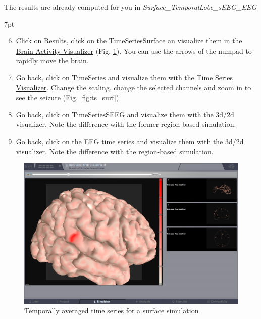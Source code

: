 \documentclass{tufte-handout}
\newenvironment{simulation}{%
  \def\FrameCommand{%
    \hspace{1pt}%
    {\color{ForestGreen}\vrule width 2pt}%
    {\color{simulationshade}\vrule width 4pt}%
    \colorbox{simulationshade}%
  }%
  \MakeFramed{\advance\hsize-\width\FrameRestore}%
  \noindent\hspace{-4.55pt}%
  \begin{adjustwidth}{}{7pt}%
  \vspace{2pt}\vspace{2pt}%
}
{%
  \vspace{2pt}\end{adjustwidth}\endMakeFramed%
}
\begin{document}
  The results are already computed for you in \textit{Surface\_TemporalLobe\_sEEG\_EEG}
 \begin{simulation}
  \begin{enumerate}
     \setcounter{enumi}{5}
  \item Click on \underline{Results}, click on the TimeSeriesSurface an visualize them in the 
  \underline{Brain Activity Visualizer} (Fig. \ref{fig:bv_surf}). You can use the arrows of the numpad to rapidly 
  move the brain.
  \item Go back,  click on \underline{TimeSeries} and visualize them with the \underline{Time Series Visualizer}. Change the scaling, change the selected channels and zoom in to see
  the seizure (Fig. \ref{fig:ts_surf}).
  \item Go back, click on \underline{TimeSeriesSEEG} and visualize them with the 3d/2d visualizer.
  Note the difference with the former region-based simulation.
  \item Go back, click on the EEG time series and visualize them with the 3d/2d visualizer.
  Note the difference with the region-based simulation.
\end{enumerate}
\end{simulation}

\begin{figure}[h]
  \includegraphics[width=\linewidth]{Handout_UI_ModellingEpilepsy_TemporalAverageTimeSeriesSurface}%
  \caption{Temporally averaged time series for a surface simulation}%
  \label{fig:bv_surf}%
\end{figure}
\end{document}
